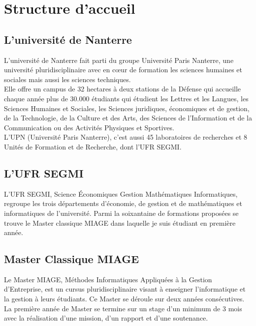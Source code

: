 \titleformat{\chapter}[display]
  {\normalfont\bfseries}{}{0pt}{\Large}

\chapter{Structure d'accueil}

\section{L'université de Nanterre}

L'université de Nanterre fait parti du groupe Université Paris Nanterre, une université pluridisciplinaire avec en cœur de formation les sciences humaines et sociales mais aussi les sciences techniques.\\

Elle offre un campus de 32 hectares à deux stations de la Défense qui accueille chaque année plus de 30.000 étudiants qui étudient les Lettres et les Langues, les Sciences Humaines et Sociales, les Sciences juridiques, économiques et de gestion, de la Technologie, de la Culture et des Arts, des Sciences de l'Information et de la Communication ou des Activités Physiques et Sportives.\\

L'UPN (Université Paris Nanterre), c'est aussi 45 laboratoires de recherches et 8 Unités de Formation et de Recherche, dont l'UFR SEGMI.\\

\section{L'UFR SEGMI}

L'UFR SEGMI, Science Économiques Gestion Mathématiques Informatiques, regroupe les trois départements d'économie, de gestion et de mathématiques et informatiques de l'université. Parmi la soixantaine de formations proposées se trouve le Master classique MIAGE dans laquelle je suis étudiant en première année.\\

\section{Master Classique MIAGE}

Le Master MIAGE, Méthodes Informatiques Appliquées à la Gestion d'Entreprise, est un cursus pluridisciplinaire visant à enseigner l'informatique et la gestion à leurs étudiants. Ce Master se déroule sur deux années consécutives. La première année de Master se termine sur un stage d'un minimum de 3 mois avec la réalisation d'une mission, d'un rapport et d'une soutenance.\\